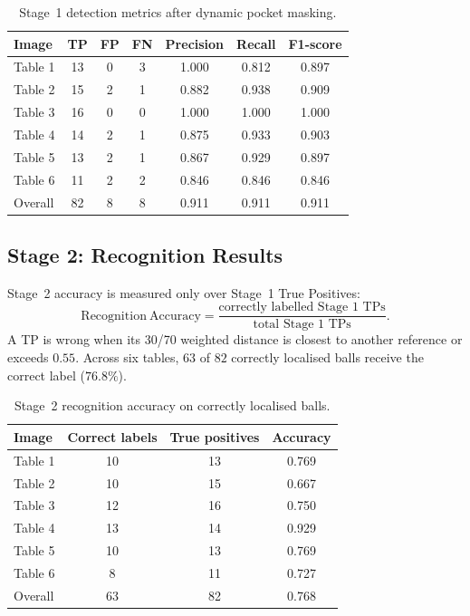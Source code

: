 \documentclass[12pt,a4paper]{article}
\begin{document}
\begin{table}[H]
\centering
\caption{Stage~1 detection metrics after dynamic pocket masking.}
\label{tab:stage1}
\begin{tabular}{lcccccc}
\toprule
Image & TP & FP & FN & Precision & Recall & F1-score \\
\midrule
Table 1 & 13 & 0 & 3 & 1.000 & 0.812 & 0.897 \\
Table 2 & 15 & 2 & 1 & 0.882 & 0.938 & 0.909 \\
Table 3 & 16 & 0 & 0 & 1.000 & 1.000 & 1.000 \\
Table 4 & 14 & 2 & 1 & 0.875 & 0.933 & 0.903 \\
Table 5 & 13 & 2 & 1 & 0.867 & 0.929 & 0.897 \\
Table 6 & 11 & 2 & 2 & 0.846 & 0.846 & 0.846 \\
\midrule
Overall & 82 & 8 & 8 & 0.911 & 0.911 & 0.911 \\
\bottomrule
\end{tabular}
\end{table}

\subsection{Stage 2: Recognition Results}

Stage~2 accuracy is measured only over Stage~1 True Positives:
\[
\mathrm{Recognition\ Accuracy}=\frac{\text{correctly labelled Stage~1 TPs}}{\text{total Stage~1 TPs}}.
\]
A TP is wrong when its 30/70 weighted distance is closest to another reference or exceeds $0.55$. Across six tables, $63$ of $82$ correctly localised balls receive the correct label ($76.8\%$).

\begin{table}[H]
\centering
\caption{Stage~2 recognition accuracy on correctly localised balls.}
\label{tab:stage2}
\begin{tabular}{lccc}
\toprule
Image & Correct labels & True positives & Accuracy \\
\midrule
Table 1 & 10 & 13 & 0.769 \\
Table 2 & 10 & 15 & 0.667 \\
Table 3 & 12 & 16 & 0.750 \\
Table 4 & 13 & 14 & 0.929 \\
Table 5 & 10 & 13 & 0.769 \\
Table 6 & 8 & 11 & 0.727 \\
\midrule
Overall & 63 & 82 & 0.768 \\
\bottomrule
\end{tabular}
\end{table}
\end{document}
